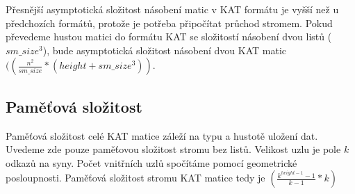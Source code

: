 Přesnější asymptotická složitost násobení matic v KAT formátu je vyšší než u předchozích formátů, protože je potřeba připočítat průchod stromem. Pokud převedeme hustou matici do formátu KAT se složitostí násobení dvou listů \bigO($sm\_size^3$), bude asymptotická složitost násobení dvou KAT matic \bigO$((\frac{n^2}{sm\_size}*(height+sm\_size^3))$.

\subsection{Paměťová složitost}

Paměťová složitost celé KAT matice záleží na typu a hustotě uložení dat. Uvedeme zde pouze paměťovou složitost stromu bez listů. Velikost uzlu je pole $k$ odkazů na syny. Počet vnitřních uzlů spočítáme pomocí geometrické posloupnosti. Paměťová složitost stromu KAT matice tedy je \bigO$(\frac{k^{height-1}-1}{k - 1} * k)$